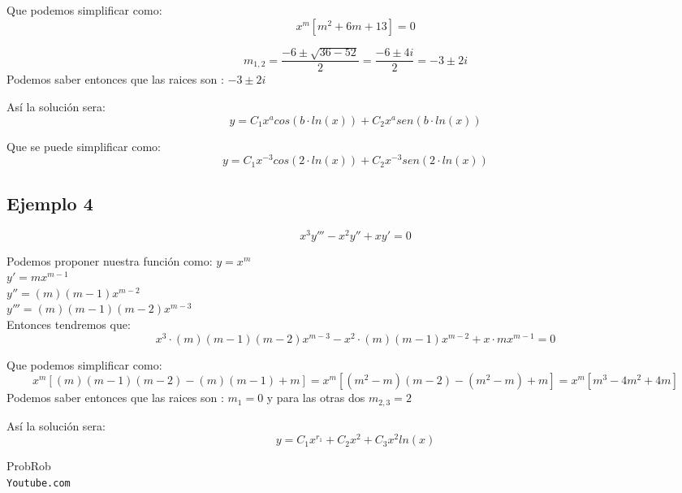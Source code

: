 \documentclass[12pt]{article}							    %
\begin{document}
		Que podemos simplificar como:
		\begin{equation*}
			x^m [m^2 + 6m + 13] = 0
		\end{equation*}

		\begin{equation*}
			m_{1,2} = \frac{-6 \pm \sqrt{36-52}}{2} = \frac{-6 \pm 4i}{2} = -3 \pm 2i
		\end{equation*}
		Podemos saber entonces que las raices son : $ -3 \pm 2i$

		Así la solución sera:
		\begin{equation*}
			y = C_1 x^a cos(b \cdot ln(x)) + C_2 x^a sen(b \cdot ln(x))
		\end{equation*}

		Que se puede simplificar como:
		\begin{equation*}
			y = C_1 x^{-3} cos(2 \cdot ln(x)) + C_2 x^{-3} sen(2 \cdot ln(x))
		\end{equation*}

		\subsection{Ejemplo 4}
		\begin{equation*}
			x^3 y''' -x^2y'' + xy' = 0
		\end{equation*}

		Podemos proponer nuestra función como:
		$y = x^m$\\
		$y' = mx^{m-1}$\\
		$y'' = (m)(m-1)x^{m-2}$\\
		$y''' = (m)(m-1)(m-2)x^{m-3}$\\

		Entonces tendremos que:
		\begin{equation*}
			x^3 \cdot (m)(m-1)(m-2)x^{m-3} -x^2 \cdot (m)(m-1)x^{m-2} + x \cdot mx^{m-1} = 0
		\end{equation*}

		Que podemos simplificar como:
		\begin{equation*}
			x^m [(m)(m-1)(m-2) - (m)(m-1) + m ] = x^m[(m^2-m)(m-2) - (m^2-m) + m] 
												= x^m[ m^3 - 4m^2 + 4m] 
		\end{equation*}
		Podemos saber entonces que las raices son : $m_1 = 0$ y para las otras dos $m_{2,3} = 2$

		Así la solución sera:
		\begin{equation*}
			y = C_1 x ^{r_1} + C_2 x^2 + C_3 x^2 ln(x)
		\end{equation*}



\clearpage

	\begin{thebibliography}{9}

		ProbRob
		\\\texttt{Youtube.com}


	 

\end{thebibliography}
\end{document}
